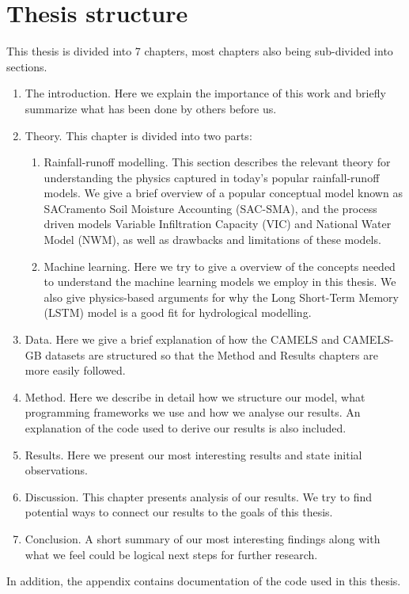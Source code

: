 \section{Thesis structure}
This thesis is divided into 7 chapters, most chapters also being sub-divided into
sections. 
\begin{enumerate}
\item  The introduction. Here we explain the importance of this work and briefly summarize what has been done by others before us.
\item Theory. This chapter is divided into two parts:
    \begin{enumerate}
    \item Rainfall-runoff modelling. This section describes the relevant theory 
        for understanding the physics captured in today's popular rainfall-runoff 
            models. We give a brief overview of a popular conceptual model known 
            as SACramento Soil Moisture Accounting (SAC-SMA), and 
            the process driven models Variable Infiltration Capacity (VIC) and 
            National Water Model (NWM), as well as drawbacks and limitations 
            of these models. 
    \item Machine learning. Here we try to give a overview of the concepts 
        needed to understand the machine learning models we employ in this thesis. 
            We also give physics-based arguments for why the Long Short-Term Memory 
            (LSTM) model is a good fit for hydrological modelling.
    \end{enumerate}
    \item Data. Here we give a brief explanation of how the CAMELS and CAMELS-GB 
    datasets are structured so that the Method and Results chapters are more easily followed.
    \item Method. Here we describe in detail how we structure our model, what programming 
        frameworks we use and how we analyse our results. An explanation of the 
        code used to derive our results is also included.
    \item Results. Here we present our most interesting results and state initial 
        observations.
    \item Discussion. This chapter presents analysis of our results. We try to 
        find potential ways to connect our results to the goals of this thesis.
    \item Conclusion. A short summary of our most interesting findings along with 
        what we feel could be logical next steps for further research.
\end{enumerate}
In addition, the appendix contains documentation of the code used in this thesis.
\nocite{4160265}
\nocite{mckinney-proc-scipy-2010}
\nocite{2020NumPy-Array}
\nocite{2020SciPy-NMeth}
\nocite{NEURIPS2019_9015}
\nocite{Prechelt1998}
